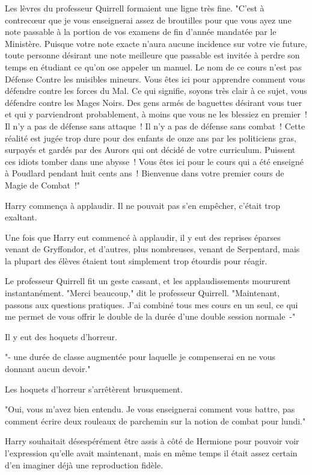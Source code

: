 Les lèvres du professeur Quirrell formaient une ligne très fine. "C'est à contrecœur que je vous enseignerai assez de broutilles pour que vous ayez une note passable à la portion de vos examens de fin d'année mandatée par le Ministère. Puisque votre note exacte n'aura aucune incidence sur votre vie future, toute personne désirant une note meilleure que passable est invitée à perdre son temps en étudiant ce qu'on ose appeler un manuel. Le nom de ce cours n'est pas Défense Contre les nuisibles mineurs. Vous êtes ici pour apprendre comment vous défendre contre les forces du Mal. Ce qui signifie, soyons très clair à ce sujet, vous défendre contre les Mages Noirs. Des gens armés de baguettes désirant vous tuer et qui y parviendront probablement, à moins que vous ne les blessiez en premier~! Il n'y a pas de défense sans attaque~! Il n'y a pas de défense sans combat~! Cette réalité est jugée trop dure pour des enfants de onze ans par les politiciens gras, surpayés et gardés par des Aurors qui ont décidé de votre curriculum. Puissent ces idiots tomber dans une abysse~! Vous êtes ici pour le cours qui a été enseigné à Poudlard pendant huit cents ans~! Bienvenue dans votre premier cours de Magie de Combat~!"

Harry commença à applaudir. Il ne pouvait pas s'en empêcher, c'était trop exaltant.

Une fois que Harry eut commencé à applaudir, il y eut des reprises éparses venant de Gryffondor, et d'autres, plus nombreuses, venant de Serpentard, mais la plupart des élèves étaient tout simplement trop étourdis pour réagir.

Le professeur Quirrell fit un geste cassant, et les applaudissements moururent instantanément. "Merci beaucoup," dit le professeur Quirrell. "Maintenant, passons aux questions pratiques. J'ai combiné tous mes cours en un seul, ce qui me permet de vous offrir le double de la durée d'une double session normale~-"

Il y eut des hoquets d'horreur.

"- une durée de classe augmentée pour laquelle je compenserai en ne vous donnant aucun devoir."

Les hoquets d'horreur s'arrêtèrent brusquement.

"Oui, vous m'avez bien entendu. Je vous enseignerai comment vous battre, pas comment écrire deux rouleaux de parchemin sur la notion de combat pour lundi."

Harry souhaitait désespérément être assis à côté de Hermione pour pouvoir voir l'expression qu'elle avait maintenant, mais en même temps il était assez certain d'en imaginer déjà une reproduction fidèle.

